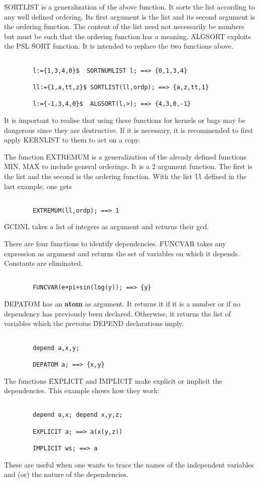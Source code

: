\f{SORTLIST} is a generalization of the above function.
It sorts the list according
to any well defined ordering. Its first argument is the list and its
second argument is the ordering function. The content of the list
need not necessarily be numbers but must be such that the ordering function
has a meaning.
\f{ALGSORT} exploits the PSL \f{SORT} function. It is intended to replace
the two functions above.
\begin{verbatim}

        l:={1,3,4,0}$  SORTNUMLIST l; ==> {0,1,3,4}

        ll:={1,a,tt,z}$ SORTLIST(ll,ordp); ==> {a,z,tt,1}

        l:={-1,3,4,0}$  ALGSORT(l,>); ==> {4,3,0,-1}

\end{verbatim}
It is important to realise that using these functions for kernels or bags
may be dangerous since they are destructive. If it is necessary, it is
recommended to first apply \f{KERNLIST} to them to act on a copy.

The function \f{EXTREMUM} is a generalization of the already defined functions
\f{MIN, MAX} to include general orderings. It is a 2 argument function.
The first is the list and the second is the ordering function.
With the list \verb+ll+ defined in the last example, one gets
\begin{verbatim}

        EXTREMUM(ll,ordp); ==> 1

\end{verbatim}

\f{GCDNL} takes a list of integers as argument and returns their gcd.  
\item[iii.] There are four functions to identify dependencies.
\f{FUNCVAR} takes any expression as argument and returns the set of
variables on which it depends. Constants are  eliminated.
\begin{verbatim}

        FUNCVAR(e+pi+sin(log(y)); ==> {y}

\end{verbatim}
\f{DEPATOM} has an {\bf atom} as argument. It returns it if it is
a number or if no dependency has previously been declared. Otherwise,
it returns the list of variables which the prevoius \f{DEPEND} declarations
imply.
\begin{verbatim}

        depend a,x,y;

        DEPATOM a; ==> {x,y}

\end{verbatim}
The functions \f{EXPLICIT} and \f{IMPLICIT} make explicit or
implicit the dependencies. This example shows how they work:
\begin{verbatim}

        depend a,x; depend x,y,z;

        EXPLICIT a; ==> a(x(y,z))

        IMPLICIT ws; ==> a

\end{verbatim}
These are useful when one wants to trace the names of the independent 
variables
and (or) the nature of the dependencies.

